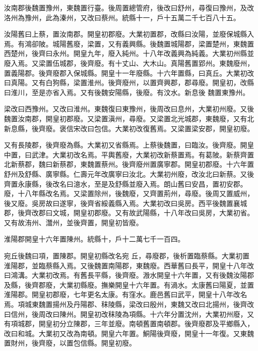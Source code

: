 \begin{pinyinscope}
 汝南郡後魏置豫州，東魏置行臺。後周置總管府，後改曰舒州，尋復曰豫州，及改洛州為豫州，此為溱州，又改曰蔡州。統縣十一，戶十五萬二千七百八十五。



 汝陽舊曰上蔡，置汝南郡。開皇初郡廢。大業初置郡，改縣曰汝陽，並廢保城縣入焉。有鴻卻陂。城陽舊廢，梁置，又有義興縣。後魏置城陽郡，梁置楚州，東魏置西楚州，後齊曰永州。開皇九年，廢入純州。十八年改義興為純義。大業初州縣並廢入焉。又梁置伍城郡，後齊廢。有十丈山、大木山。真陽舊置郢州。東魏廢州，置義陽郡。後齊廢郡入保城縣。開皇十一年廢縣。十六年置縣，曰真丘。大業初改曰真陽。又有白狗縣，梁置淮州。後齊廢州，以置齊興郡，郡尋廢。開皇初，改縣曰淮川，至是亦省入焉。又有後魏安陽縣，後廢。有汶水。新息後
 魏置東豫州。



 梁改曰西豫州。又改曰淮州。東魏復曰東豫州，後周改曰息州，大業初州廢。又後魏置汝南郡，開皇初郡廢。又梁置滇州，尋廢。又梁置北光城郡，東魏廢，又有北新息縣，後齊廢。褒信宋改曰包信。大業初改復舊焉。又梁置梁安郡，開皇初廢。



 又有長陵郡，後齊廢為縣。大業初又省縣焉。上蔡後魏置，曰臨汝。後齊廢。開皇中置，曰武津。大業初改名焉。平輿舊廢，大業初改新蔡置焉。有葛陂。新蔡齊置北新蔡郡，魏曰新蔡郡，東魏置蔡州。後齊廢州置廣寧郡。開皇初郡廢。十六年置舒州及舒縣、廣寧縣。仁壽元年改廣寧曰汝北。大業初州廢，改汝北曰新蔡。又後齊置永康縣，後改名曰澺水，至是及舒縣並廢入焉。朗山舊曰安昌，置初安郡。廢，十八年縣改名焉。又梁置除州，後魏廢，又齊置荊州，尋廢。後周又置威州，後又廢。吳房故曰遂寧，後齊省綏義縣入焉。大業初改曰吳房。西平後魏置襄城郡，後齊改郡曰文城，開皇初郡廢。又有故武陽縣，十八年改曰吳房，大業初省。又有故洧州、灊州，並後齊置，開皇初皆廢。



 淮陽郡開皇十六年置陳州。統縣十，戶十二萬七千一百四。



 宛丘後魏曰項，置陳郡。開皇初縣改名宛
 丘，尋廢郡，後析置臨蔡縣。大業初置淮陽郡，並臨蔡縣入焉。又後魏置南陽郡，東魏廢。西華舊曰長平，開皇十八年改曰鴻溝。大業初改焉。有舊長平縣，後齊廢。溵水開皇十六年置，又有後魏汝陽郡及縣，後齊郡廢，大業初縣廢。撫樂開皇十六年置。有渦水。太康舊曰陽夏，並置淮陽郡。開皇初郡廢，七年更名太康。有窪水。鹿邑舊曰武平，開皇十八年改名焉。項城東魏置揚州及丹陽郡、秣陵縣，梁改曰殷州，東魏又改曰北揚州，後齊改曰信州，後周改曰陳州。開皇初改秣陵為項縣。十六年分置沈州，大業初州廢，又有項城郡，開皇初分立陳郡，三年並廢。南頓舊置南頓郡。後齊廢郡及平鄉縣入，改曰和城。大業初又改為南頓。開皇六年置。鮦陽後齊廢，開皇十一年復。又東魏置財州，後齊廢，以置包信縣。開皇初廢。




\end{pinyinscope}
